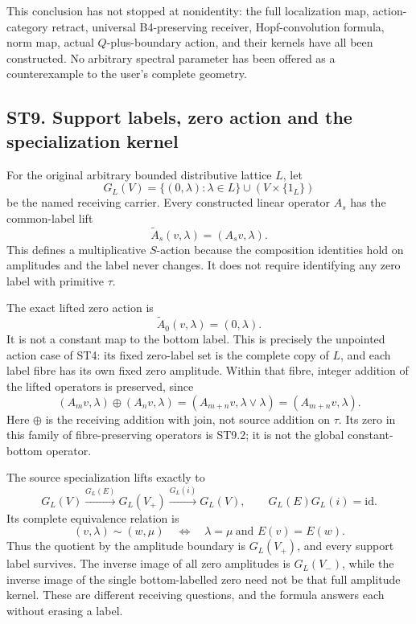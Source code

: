 This conclusion has not stopped at nonidentity: the full localization
map, action-category retract, universal B4-preserving receiver,
Hopf-convolution formula, norm map, actual \(Q\)-plus-boundary action,
and their kernels have all been constructed. No arbitrary spectral
parameter has been offered as a counterexample to the user's complete
geometry.

\subsection{ST9. Support labels, zero action and the specialization
kernel}\label{st9.-support-labels-zero-action-and-the-specialization-kernel}

For the original arbitrary bounded distributive lattice \(L\), let \[
 G_L(V)=\{(0,\lambda):\lambda\in L\}\cup(V\times\{1_L\})
\] be the named receiving carrier. Every constructed linear operator
\(A_s\) has the common-label lift \[
 \widetilde A_s(v,\lambda)=(A_s v,\lambda).
\tag{ST9.1}
\] This defines a multiplicative \(S\)-action because the composition
identities hold on amplitudes and the label never changes. It does not
require identifying any zero label with primitive \(\tau\).

The exact lifted zero action is \[
 \widetilde A_0(v,\lambda)=(0,\lambda).
\tag{ST9.2}
\] It is not a constant map to the bottom label. This is precisely the
unpointed action case of ST4: its fixed zero-label set is the complete
copy of \(L\), and each label fibre has its own fixed zero amplitude.
Within that fibre, integer addition of the lifted operators is
preserved, since \[
 (A_m v,\lambda)\oplus(A_n v,\lambda)
 =(A_{m+n}v,\lambda\vee\lambda)
 =(A_{m+n}v,\lambda).
\tag{ST9.3}
\] Here \(\oplus\) is the receiving addition with join, not source
addition on \(\tau\). Its zero in this family of fibre-preserving
operators is ST9.2; it is not the global constant-bottom operator.

The source specialization lifts exactly to \[
 G_L(V)\xrightarrow{G_L(E)}G_L(V_+)
 \xrightarrow{G_L(i)}G_L(V),\qquad
 G_L(E)G_L(i)=\mathrm{id}.
\tag{ST9.4}
\] Its complete equivalence relation is \[
 (v,\lambda)\sim(w,\mu)
 \quad\Longleftrightarrow\quad
 \lambda=\mu\ \text{and }E(v)=E(w).
\tag{ST9.5}
\] Thus the quotient by the amplitude boundary is \(G_L(V_+)\), and
every support label survives. The inverse image of all zero amplitudes
is \(G_L(V_-)\), while the inverse image of the single bottom-labelled
zero need not be that full amplitude kernel. These are different
receiving questions, and the formula answers each without erasing a
label.

